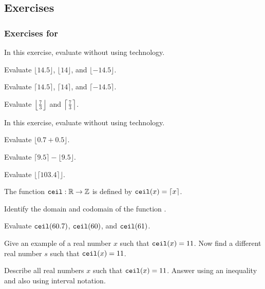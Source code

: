
\subsection{Exercises}


\subsubsection*{Exercises for  \subfloorceiling}

\begin{exer}[\exerP] %
\label{exer_floor_ceiling_calculate}
    In this exercise, evaluate without using technology.
        \begin{exerpart}
            \item Evaluate $\lfloor 14.5 \rfloor$, $\lfloor 14 \rfloor$, and $\lfloor -14.5 \rfloor$.
            \item Evaluate $\lceil 14.5 \rceil$, $\lceil 14 \rceil$, and $\lceil -14.5 \rceil$.
            \item Evaluate $\left\lfloor \frac{7}{3} \right\rfloor$ and $\left\lceil \frac{7}{3} \right\rceil$.
        \end{exerpart}
\end{exer}

\begin{exer}[\exerP] %
\label{exer_floor_ceiling_order_ops}
    In this exercise, evaluate without using technology.
        \begin{exerpart}
            \item Evaluate $\lfloor 0.7 + 0.5 \rfloor$.
            \item Evaluate $\lceil 9.5 \rceil  -  \lfloor 9.5 \rfloor$.
            \item Evaluate $\lfloor \lceil 103.4 \rceil \rfloor$. 
        \end{exerpart}
\end{exer}

\begin{exer}[\exerP] %
\label{exer_ceiling_function}
    The function $\texttt{ceil}: \mathbb{R} \to \mathbb{Z}$ is defined by $\texttt{ceil}(x) = \lceil x \rceil$.   
        \begin{exerpart}
            \item Identify the domain and codomain of the function .
            \item Evaluate $\texttt{ceil}(60.7)$, $\texttt{ceil}(60)$, and $\texttt{ceil}(61)$.
            \item Give an example of a real number $x$ such that $\texttt{ceil}(x) = 11$.  Now find a different real number $s$ such that $\texttt{ceil}(x)=11$.
            \item Describe all real numbers $x$ such that $\texttt{ceil}(x)=11$. Answer using an inequality and also using interval notation.
        \end{exerpart}
\end{exer}

